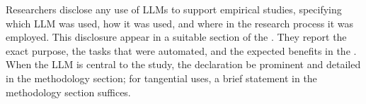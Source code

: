 Researchers \must disclose any use of LLMs to support empirical studies, specifying which LLM was used, how it was used, and where in the research process it was employed. This disclosure \should appear in a suitable section of the \paper. They \should report the exact purpose, the tasks that were automated, and the expected benefits in the \paper. When the LLM is central to the study, the declaration \should be prominent and detailed in the methodology section; for tangential uses, a brief statement in the methodology section suffices.
